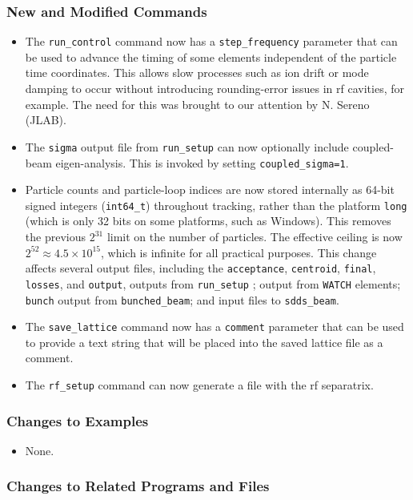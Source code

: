 \documentclass[11pt]{article}
\begin{document}
\subsubsection{New and Modified Commands}
\begin{itemize}
\item The \verb|run_control| command now has a \verb|step_frequency| parameter that can be used to advance the timing of
  some elements independent of the particle time coordinates. This allows slow processes such as ion drift or mode damping to
  occur without introducing rounding-error issues in rf cavities, for example. The need for this was brought to our attention
  by N. Sereno (JLAB).
\item The \verb|sigma| output file from \verb|run_setup| can now optionally include coupled-beam eigen-analysis\cite{Wolski-PRSTAB9-024001}.
  This is invoked by setting \verb|coupled_sigma=1|.
\item Particle counts and particle-loop indices are now stored internally as 64-bit signed integers
  (\verb|int64_t|) throughout tracking, rather than the platform \verb|long| (which is only 32 bits on
  some platforms, such as Windows). This removes the previous $2^{31}$ limit on the number of particles.
  The effective ceiling is now $2^{52}\approx 4.5\times 10^{15}$, which is infinite for all practical purposes.
  This change affects several output files, including the \verb|acceptance|, \verb|centroid|, \verb|final|, \verb|losses|, and \verb|output|, 
  outputs from \verb|run_setup| ; output from \verb|WATCH| elements; \verb|bunch| output from \verb|bunched_beam|; and
  input files to \verb|sdds_beam|.
\item The \verb|save_lattice| command now has a \verb|comment| parameter that can be used to provide a text string that
  will be placed into the saved lattice file as a comment.
\item The \verb|rf_setup| command can now generate a file with the rf separatrix.
\end{itemize}

\subsubsection{Changes to Examples}

\begin{itemize}
\item None.
\end{itemize}

\subsubsection{Changes to Related Programs and Files}
\end{document}
